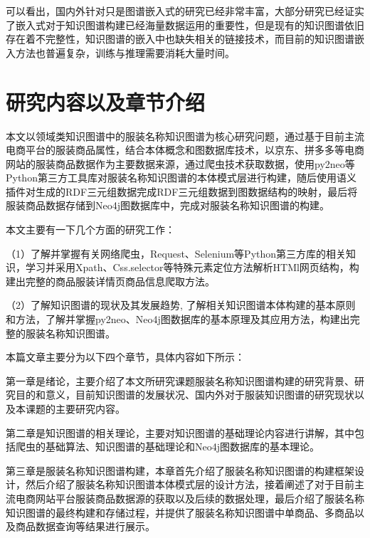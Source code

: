 \documentclass[bachelor_p]{hdu-thesis}
\begin{document}
可以看出，国内外针对只是图谱嵌入式的研究已经非常丰富，大部分研究已经证实了嵌入式对于知识图谱构建已经海量数据运用的重要性，但是现有的知识图谱依旧存在着不完整性，知识图谱的嵌入中也缺失相关的链接技术，而目前的知识图谱嵌入方法也普遍复杂，训练与推理需要消耗大量时间。

\section{研究内容以及章节介绍}

本文以领域类知识图谱中的服装名称知识图谱为核心研究问题，通过基于目前主流电商平台的服装商品属性，结合本体概念和图数据库技术，以京东、拼多多等电商网站的服装商品数据作为主要数据来源，通过爬虫技术获取数据，使用py2neo等Python第三方工具库对服装名称知识图谱的本体模式层进行构建，随后使用语义插件对生成的RDF三元组数据完成RDF三元组数据到图数据结构的映射，最后将服装商品数据存储到Neo4j图数据库中，完成对服装名称知识图谱的构建。

本文主要有一下几个方面的研究工作：

（1）了解并掌握有关网络爬虫，Request、Selenium等Python第三方库的相关知识，学习并采用Xpath、Css.selector等特殊元素定位方法解析HTMl网页结构，构建出完整的商品服装详情页商品信息爬取方法。

（2）了解知识图谱的现状及其发展趋势, 了解相关知识图谱本体构建的基本原则和方法，了解并掌握py2neo、Neo4j图数据库的基本原理及其应用方法，构建出完整的服装名称知识图谱。





本篇文章主要分为以下四个章节，具体内容如下所示：

第一章是绪论，主要介绍了本文所研究课题服装名称知识图谱构建的研究背景、研究目的和意义，目前知识图谱的发展状况、国内外对于服装知识图谱的研究现状以及本课题的主要研究内容。

第二章是知识图谱的相关理论，主要对知识图谱的基础理论内容进行讲解，其中包括爬虫的基础算法、知识图谱的基础理论和Neo4j图数据库的基本理论。

第三章是服装名称知识图谱构建，本章首先介绍了服装名称知识图谱的构建框架设计，然后介绍了服装名称知识图谱本体模式层的设计方法，接着阐述了对于目前主流电商网站平台服装商品数据源的获取以及后续的数据处理，最后介绍了服装名称知识图谱的最终构建和存储过程，并提供了服装名称知识图谱中单商品、多商品以及商品数据查询等结果进行展示。
\end{document}
